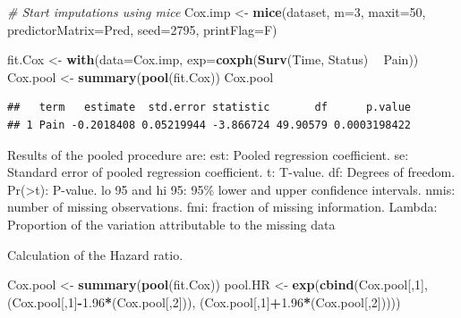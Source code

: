 \documentclass[
]{book}
\newenvironment{Shaded}{\begin{snugshade}}{\end{snugshade}}
\newcommand{\CommentTok}[1]{\textcolor[rgb]{0.56,0.35,0.01}{\textit{#1}}}
\newcommand{\DataTypeTok}[1]{\textcolor[rgb]{0.13,0.29,0.53}{#1}}
\newcommand{\DecValTok}[1]{\textcolor[rgb]{0.00,0.00,0.81}{#1}}
\newcommand{\FloatTok}[1]{\textcolor[rgb]{0.00,0.00,0.81}{#1}}
\newcommand{\KeywordTok}[1]{\textcolor[rgb]{0.13,0.29,0.53}{\textbf{#1}}}
\newcommand{\NormalTok}[1]{#1}
\newcommand{\OperatorTok}[1]{\textcolor[rgb]{0.81,0.36,0.00}{\textbf{#1}}}
\newcommand{\StringTok}[1]{\textcolor[rgb]{0.31,0.60,0.02}{#1}}
\begin{document}
\begin{Shaded}
\begin{Highlighting}[]
\CommentTok{# Start imputations using mice}
\NormalTok{Cox.imp <-}\StringTok{ }\KeywordTok{mice}\NormalTok{(dataset, }\DataTypeTok{m=}\DecValTok{3}\NormalTok{, }\DataTypeTok{maxit=}\DecValTok{50}\NormalTok{, }\DataTypeTok{predictorMatrix=}\NormalTok{Pred, }\DataTypeTok{seed=}\DecValTok{2795}\NormalTok{, }\DataTypeTok{printFlag=}\NormalTok{F)}

\NormalTok{fit.Cox <-}\StringTok{ }\KeywordTok{with}\NormalTok{(}\DataTypeTok{data=}\NormalTok{Cox.imp, }\DataTypeTok{exp=}\KeywordTok{coxph}\NormalTok{(}\KeywordTok{Surv}\NormalTok{(Time, Status) }\OperatorTok{~}\StringTok{ }\NormalTok{Pain))}
\NormalTok{Cox.pool <-}\StringTok{ }\KeywordTok{summary}\NormalTok{(}\KeywordTok{pool}\NormalTok{(fit.Cox))}
\NormalTok{Cox.pool}
\end{Highlighting}
\end{Shaded}

\begin{verbatim}
##   term   estimate  std.error statistic       df      p.value
## 1 Pain -0.2018408 0.05219944 -3.866724 49.90579 0.0003198422
\end{verbatim}

Results of the pooled procedure are:
est: Pooled regression coefficient.
se: Standard error of pooled regression coefficient.
t: T-value.
df: Degrees of freedom.
Pr(\textgreater\textbar t\textbar): P-value.
lo 95 and hi 95: 95\% lower and upper confidence intervals.
nmis: number of missing observations.
fmi: fraction of missing information.
Lambda: Proportion of the variation attributable to the missing data

Calculation of the Hazard ratio.

\begin{Shaded}
\begin{Highlighting}[]
\NormalTok{Cox.pool <-}\StringTok{ }\KeywordTok{summary}\NormalTok{(}\KeywordTok{pool}\NormalTok{(fit.Cox))}
\NormalTok{pool.HR <-}\StringTok{ }\KeywordTok{exp}\NormalTok{(}\KeywordTok{cbind}\NormalTok{(Cox.pool[,}\DecValTok{1}\NormalTok{], (Cox.pool[,}\DecValTok{1}\NormalTok{]}\OperatorTok{-}\FloatTok{1.96}\OperatorTok{*}\NormalTok{(Cox.pool[,}\DecValTok{2}\NormalTok{])), }
\NormalTok{           (Cox.pool[,}\DecValTok{1}\NormalTok{]}\OperatorTok{+}\FloatTok{1.96}\OperatorTok{*}\NormalTok{(Cox.pool[,}\DecValTok{2}\NormalTok{]))))}
\end{Highlighting}
\end{Shaded}
\end{document}

